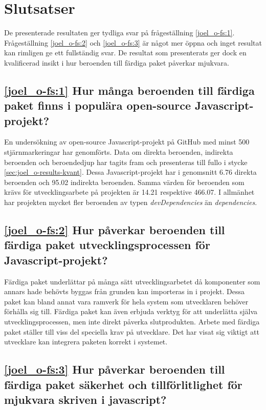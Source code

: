 \section{Slutsatser}
\label{sec:joel_o-conclusion}
De presenterade resultaten ger tydliga svar på frågeställning \ref{joel_o-fs:1}. Frågeställning \ref{joel_o-fs:2} och \ref{joel_o-fs:3} är något mer öppna och inget resultat kan rimligen ge ett fullständig svar. De resultat som presenterats ger dock en kvalificerad insikt i hur beroenden till färdiga paket påverkar mjukvara.

\subsection*{\ref{joel_o-fs:1} Hur många beroenden till färdiga paket finns i populära open-source Javascript-projekt?}

En undersökning av open-source Javascript-projekt på GitHub med minst 500 stjärnmarkeringar har genomförts. Data om direkta beroenden, indirekta beroenden och beroendedjup har tagits fram och presenteras till fullo i stycke \ref{sec:joel_o-results-kvant}. Dessa Javascript-projekt har i genomsnitt 6.76 direkta beroenden och 95.02 indirekta beroenden. Samma värden för beroenden som krävs för utvecklingsarbete på projekten är 14.21 respektive 466.07. I allmänhet har projekten mycket fler beroenden av typen \textit{devDependencies} än \textit{dependencies}.

\subsection*{\ref{joel_o-fs:2} Hur påverkar beroenden till färdiga paket utvecklingsprocessen för Javascript-projekt?}

Färdiga paket underlättar på många sätt utvecklingsarbetet då komponenter som annars hade behövts byggas från grunden kan importeras in i projekt. Dessa paket kan bland annat vara ramverk för hela system som utvecklaren behöver förhålla sig till. Färdiga paket kan även erbjuda verktyg för att underlätta själva utvecklingsprocessen, men inte direkt påverka slutprodukten. Arbete med färdiga paket ställer till viss del speciella krav på utvecklare. Det har visat sig viktigt att utvecklare kan integrera paketen korrekt i systemet.

\subsection*{\ref{joel_o-fs:3} Hur påverkar beroenden till färdiga paket säkerhet och tillförlitlighet för mjukvara skriven i javascript?}

